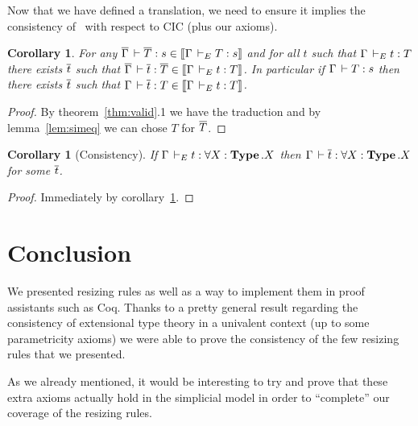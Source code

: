\documentclass[11pt]{article}
\theoremstyle{plain}
\newtheorem{corollary}[theorem]{Corollary}
\theoremstyle{remark}
\begin{document}
Now that we have defined a translation, we need to ensure it implies the
consistency of \CCe\ with respect to CIC (plus our axioms).

\begin{corollary}
  \label{cor:choice}
  For any $\overline{\Gamma} \,\vdash \overline{T} : s \in \mathopen{{[\kern-0.14em[}} \Gamma \,\vdash_E T : s \mathclose{{]\kern-0.14em]}}$ and for all
  $t$ such that $\Gamma \,\vdash_E t : T$ there exists $\overline{t}$ such that
  $\overline{\Gamma} \,\vdash \overline{t} : \overline{T} \in \mathopen{{[\kern-0.14em[}} \Gamma \,\vdash_E t : T \mathclose{{]\kern-0.14em]}}$.
  In particular if $\Gamma \,\vdash T : s$ then there exists $\overline{t}$ such that
  $\Gamma \,\vdash \overline{t} : T \in \mathopen{{[\kern-0.14em[}} \Gamma \,\vdash_E t : T \mathclose{{]\kern-0.14em]}}$.
\end{corollary}

\begin{proof}
  By theorem~\ref{thm:valid}.1 we have the traduction and by
  lemma~\ref{lem:simeq} we can chose $T$ for $\overline{T}$.
\end{proof}

\begin{corollary}[Consistency]
  If $\Gamma \,\vdash_E t : \forall X:\operatorname{\mathbf{Type}}.X$
  then $\Gamma \,\vdash \overline{t} : \forall X:\operatorname{\mathbf{Type}}.X$ for some $\overline{t}$.
\end{corollary}

\begin{proof}
  Immediately by corollary~\ref{cor:choice}.
\end{proof}

\section*{Conclusion}

We presented resizing rules as well as a way to implement them in proof
assistants such as Coq. Thanks to a pretty general result regarding the
consistency of extensional type theory in a univalent context (up to some
parametricity axioms) we were able to prove the consistency of the few
resizing rules that we presented.

As we already mentioned, it would be interesting to try and prove that these
extra axioms actually hold in the simplicial model in order to ``complete''
our coverage of the resizing rules.




\end{document}
